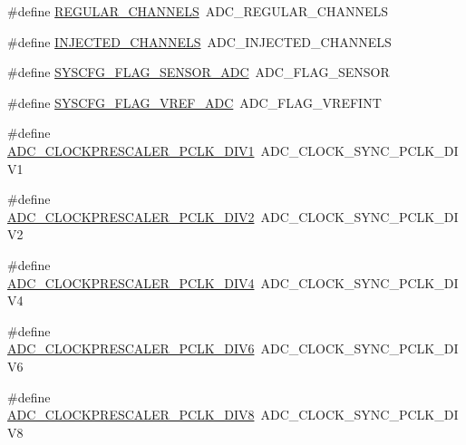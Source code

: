 \begin{DoxyCompactItemize}
\item 
\#define \hyperlink{group___h_a_l___a_d_c___aliased___defines_ga9480bc25f45fc189111dba13103c404e}{R\+E\+G\+U\+L\+A\+R\+\_\+\+C\+H\+A\+N\+N\+E\+LS}~A\+D\+C\+\_\+\+R\+E\+G\+U\+L\+A\+R\+\_\+\+C\+H\+A\+N\+N\+E\+LS
\item 
\#define \hyperlink{group___h_a_l___a_d_c___aliased___defines_ga458eefd477e1e06e313716de162b7d0f}{I\+N\+J\+E\+C\+T\+E\+D\+\_\+\+C\+H\+A\+N\+N\+E\+LS}~A\+D\+C\+\_\+\+I\+N\+J\+E\+C\+T\+E\+D\+\_\+\+C\+H\+A\+N\+N\+E\+LS
\item 
\#define \hyperlink{group___h_a_l___a_d_c___aliased___defines_ga48929ac8156ee0ea52c25ad3ec9fed11}{S\+Y\+S\+C\+F\+G\+\_\+\+F\+L\+A\+G\+\_\+\+S\+E\+N\+S\+O\+R\+\_\+\+A\+DC}~A\+D\+C\+\_\+\+F\+L\+A\+G\+\_\+\+S\+E\+N\+S\+OR
\item 
\#define \hyperlink{group___h_a_l___a_d_c___aliased___defines_gaa7f5151463037ce60032a869f3e71665}{S\+Y\+S\+C\+F\+G\+\_\+\+F\+L\+A\+G\+\_\+\+V\+R\+E\+F\+\_\+\+A\+DC}~A\+D\+C\+\_\+\+F\+L\+A\+G\+\_\+\+V\+R\+E\+F\+I\+NT
\item 
\#define \hyperlink{group___h_a_l___a_d_c___aliased___defines_gaaf80e00044e185957328f1d59bacdf37}{A\+D\+C\+\_\+\+C\+L\+O\+C\+K\+P\+R\+E\+S\+C\+A\+L\+E\+R\+\_\+\+P\+C\+L\+K\+\_\+\+D\+I\+V1}~A\+D\+C\+\_\+\+C\+L\+O\+C\+K\+\_\+\+S\+Y\+N\+C\+\_\+\+P\+C\+L\+K\+\_\+\+D\+I\+V1
\item 
\#define \hyperlink{group___h_a_l___a_d_c___aliased___defines_ga058aa1143f9f7f123362039c9efcf4cb}{A\+D\+C\+\_\+\+C\+L\+O\+C\+K\+P\+R\+E\+S\+C\+A\+L\+E\+R\+\_\+\+P\+C\+L\+K\+\_\+\+D\+I\+V2}~A\+D\+C\+\_\+\+C\+L\+O\+C\+K\+\_\+\+S\+Y\+N\+C\+\_\+\+P\+C\+L\+K\+\_\+\+D\+I\+V2
\item 
\#define \hyperlink{group___h_a_l___a_d_c___aliased___defines_ga98bc3d5a9f7e069183a205c8458a6645}{A\+D\+C\+\_\+\+C\+L\+O\+C\+K\+P\+R\+E\+S\+C\+A\+L\+E\+R\+\_\+\+P\+C\+L\+K\+\_\+\+D\+I\+V4}~A\+D\+C\+\_\+\+C\+L\+O\+C\+K\+\_\+\+S\+Y\+N\+C\+\_\+\+P\+C\+L\+K\+\_\+\+D\+I\+V4
\item 
\#define \hyperlink{group___h_a_l___a_d_c___aliased___defines_gae5cbf680825b9ccaa02bdbab9217f550}{A\+D\+C\+\_\+\+C\+L\+O\+C\+K\+P\+R\+E\+S\+C\+A\+L\+E\+R\+\_\+\+P\+C\+L\+K\+\_\+\+D\+I\+V6}~A\+D\+C\+\_\+\+C\+L\+O\+C\+K\+\_\+\+S\+Y\+N\+C\+\_\+\+P\+C\+L\+K\+\_\+\+D\+I\+V6
\item 
\#define \hyperlink{group___h_a_l___a_d_c___aliased___defines_ga93ccda8f421de00a2aa5b0b19b665393}{A\+D\+C\+\_\+\+C\+L\+O\+C\+K\+P\+R\+E\+S\+C\+A\+L\+E\+R\+\_\+\+P\+C\+L\+K\+\_\+\+D\+I\+V8}~A\+D\+C\+\_\+\+C\+L\+O\+C\+K\+\_\+\+S\+Y\+N\+C\+\_\+\+P\+C\+L\+K\+\_\+\+D\+I\+V8

\end{DoxyCompactItemize}
